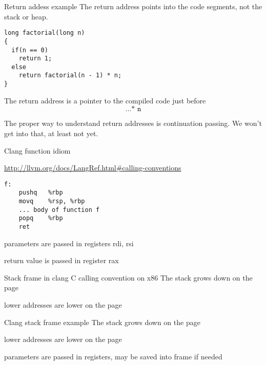 \documentclass[landscape]{beamer}
\begin{document}
\begin{frame}[fragile]{Return addess example}
The return address points into the code segments, \alert{not the stack} or heap.

\begin{verbatim}
long factorial(long n)
{
  if(n == 0)
    return 1;
  else
    return factorial(n - 1) * n;
}
\end{verbatim}

The return address is a pointer to the compiled code just before 
\[
\ldots
\texttt{* n}
\]

The proper way to understand return addresses is continuation passing. We won't get into that, at least not yet.
\end{frame}


\begin{frame}[fragile]{Clang function idiom}

\url{http://llvm.org/docs/LangRef.html#calling-conventions}

\begin{verbatim}
f:
	pushq	%rbp
	movq	%rsp, %rbp
    ... body of function f
	popq	%rbp
	ret
\end{verbatim}

parameters are passed in registers rdi, rsi

return value is passed in register rax
\end{frame}


\begin{frame}[fragile]{Stack frame in clang C calling convention on x86}
The stack grows down on the page

lower addresses are lower on the page

  
\end{frame} 


\begin{frame}[fragile]{Clang stack frame example}
The stack grows down on the page

lower addresses are lower on the page

parameters are passed in registers, may be saved into frame if needed

  
\end{frame} 
\end{document}
